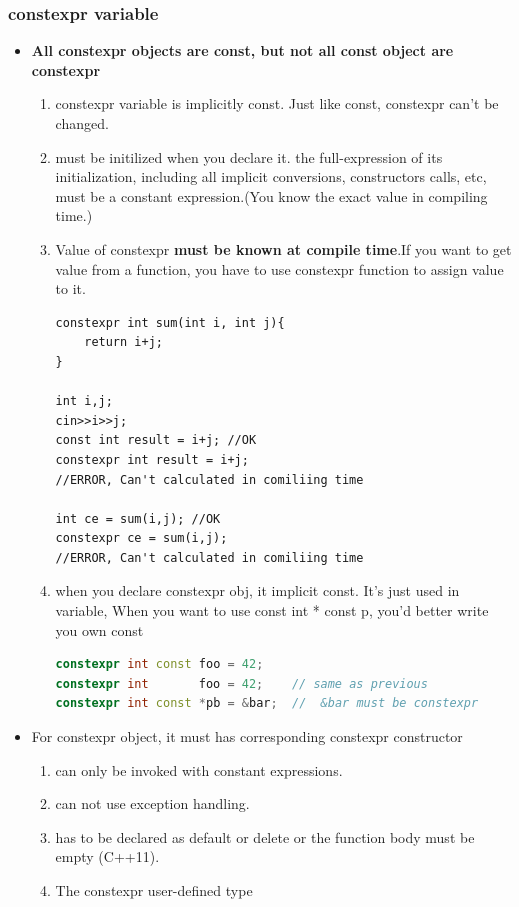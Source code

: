 \documentclass[a4paper,12pt,twoside]{book}
\begin{document}
\subsubsection{constexpr variable}
\begin{itemize}
	\item \textbf{All constexpr objects are const, but not all const object are constexpr}
	\begin{enumerate}
		\item constexpr variable is implicitly const. Just like const, constexpr can't be changed. 
		
		\item must be initilized when you declare it. the full-expression of its initialization, including all implicit conversions, constructors calls, etc, must be a constant expression.(You know the exact value in compiling time.)
		
		\item Value of constexpr \textbf{must be known at compile time}.If you want to get value from a function, you have to use constexpr function to assign value to it. 
		
\begin{lstlisting}
constexpr int sum(int i, int j){
	return i+j;
}

int i,j;
cin>>i>>j;
const int result = i+j; //OK
constexpr int result = i+j; 
//ERROR, Can't calculated in comiliing time

int ce = sum(i,j); //OK
constexpr ce = sum(i,j); 
//ERROR, Can't calculated in comiliing time
\end{lstlisting}

		\item when you declare constexpr obj, it implicit const. It's just used in variable, When you want to use const int * const p, you'd better write you own const 
\begin{lstlisting}[frame=single, language=c++]
constexpr int const foo = 42;
constexpr int       foo = 42;    // same as previous
constexpr int const *pb = &bar;  //  &bar must be constexpr
\end{lstlisting}
		\end{enumerate}

\item For constexpr object, it must has corresponding  constexpr constructor 
\begin{enumerate}
	\item can only be invoked with constant expressions.
	\item can not use exception handling.
	\item has to be declared as default or delete or the function body must be empty (C++11).
	\item The constexpr user-defined type
\end{enumerate}


\end{itemize}
\end{document}
